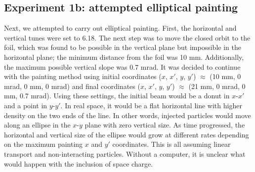 \subsection{Experiment 1b: attempted elliptical painting}

Next, we attempted to carry out elliptical painting. First, the horizontal and vertical tunes were set to 6.18. The next step was to move the closed orbit to the foil, which was found to be possible in the vertical plane but impossible in the horizontal plane; the minimum distance from the foil was 10 mm. Additionally, the maximum possible vertical slope was 0.7 mrad. It was decided to continue with the painting method using initial coordinates ($x$, $x'$, $y$, $y'$) $\approx$ (10 mm, 0 mrad, 0 mm, 0 mrad) and final coordinates ($x$, $x'$, $y$, $y'$) $\approx$ (21 mm, 0 mrad, 0 mm, 0.7 mrad). Using these settings, the initial beam would be a donut in $x$-$x'$ and a point in $y$-$y'$. In real space, it would be a flat horizontal line with higher density on the two ends of the line. In other words, injected particles would move along an ellipse in the $x$-$y$ plane with zero vertical size. As time progressed, the horizontal and vertical size of the ellipse would grow at different rates depending on the maximum painting $x$ and $y'$ coordinates. This is all assuming linear transport and non-interacting particles. Without a computer, it is unclear what would happen with the inclusion of space charge.

